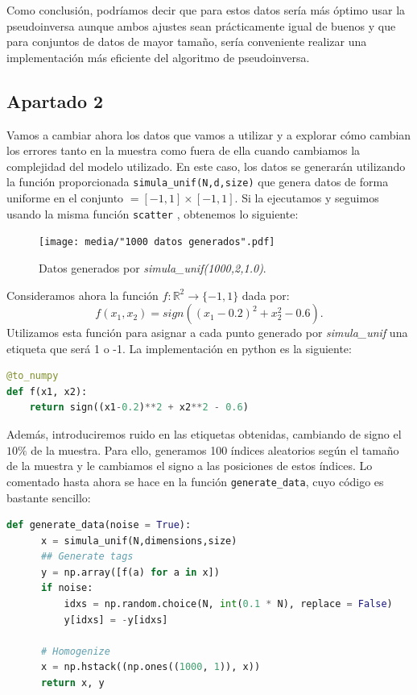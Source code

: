\documentclass[12pt]{scrartcl}
\begin{document}
{Como conclusión, podríamos decir que para estos datos sería más óptimo usar la pseudoinversa aunque ambos ajustes sean prácticamente igual de buenos y que para conjuntos de datos de mayor tamaño, sería
conveniente realizar una implementación más eficiente del algoritmo de pseudoinversa.

\subsection*{Apartado 2}

Vamos a cambiar ahora los datos que vamos a utilizar y a explorar cómo cambian los errores tanto en la muestra como fuera de ella cuando cambiamos la complejidad del modelo utilizado. En este caso, los datos
se generarán utilizando la función proporcionada \lstinline{simula_unif(N,d,size)} que genera datos de forma uniforme en el conjunto $\mathcal = [-1,1]\times [-1,1]$. Si la ejecutamos y seguimos usando la misma función
\lstinline{scatter} , obtenemos lo siguiente:
\begin{figure}[H]
  \centering
  \texttt{[image: media/"1000 datos generados".pdf]}
  \caption{Datos generados por \emph{simula\_unif(1000,2,1.0)}.}
\end{figure}
Consideramos ahora la función $f:\mathbb R^2 \to \{-1,1\}$ dada por:
$$
f(x_1,x_2) = sign((x_1 - 0.2)^2 + x_2^2 - 0.6).
$$
Utilizamos esta función para asignar a cada punto generado por \emph{simula\_unif} una etiqueta que será 1 o -1. La implementación en python es la siguiente:

\begin{lstlisting}[language=Python]
@to_numpy
def f(x1, x2):
	return sign((x1-0.2)**2 + x2**2 - 0.6)
\end{lstlisting}


Además, introduciremos ruido en las etiquetas obtenidas, cambiando de signo el $10\%$ de la muestra. Para ello, generamos 100 índices aleatorios según el tamaño de la muestra y le cambiamos
el signo a las posiciones de estos índices. Lo comentado hasta ahora se hace en la función \lstinline{generate_data}, cuyo código es bastante sencillo:

\begin{lstlisting}[language=Python]
  def generate_data(noise = True):
	  x = simula_unif(N,dimensions,size)
	  ## Generate tags
	  y = np.array([f(a) for a in x])
	  if noise:
		  idxs = np.random.choice(N, int(0.1 * N), replace = False)
		  y[idxs] = -y[idxs]
	
	  # Homogenize
	  x = np.hstack((np.ones((1000, 1)), x))
	  return x, y


\end{lstlisting}}
\end{document}
